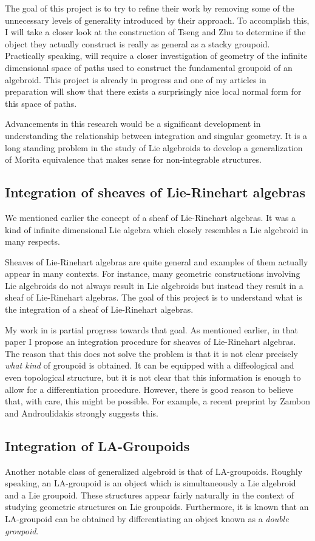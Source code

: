 \documentclass[11pt, letterpaper]{article}
\begin{document}
The goal of this project is to try to refine their work by removing some of the unnecessary levels of generality introduced by their approach. To accomplish this, I will take a closer look at the construction of Tseng and Zhu to determine if the object they actually construct is really as general as a stacky groupoid. Practically speaking, will require a closer investigation of geometry of the infinite dimensional space of paths used to construct the fundamental groupoid of an algebroid. This project is already in progress and one of my articles in preparation will show that there exists a surprisingly nice local normal form for this space of paths.

Advancements in this research would be a significant development in understanding the relationship between integration and singular geometry. It is a long standing problem in the study of Lie algebroids to develop a generalization of Morita equivalence that makes sense for non-integrable structures.
\subsection{Integration of sheaves of Lie-Rinehart algebras}\label{proj:lie.rinehart}
We mentioned earlier the concept of a sheaf of Lie-Rinehart algebras. It was a kind of infinite dimensional Lie algebra which closely resembles a Lie algebroid in many respects.

Sheaves of Lie-Rinehart algebras are quite general and examples of them actually appear in many contexts. For instance, many geometric constructions involving Lie algebroids do not always result in Lie algebroids but instead they result in a sheaf of Lie-Rinehart algebras. The goal of this project is to understand what is the integration of a sheaf of Lie-Rinehart algebras.

My work in \cite{fresh} is partial progress towards that goal. As mentioned earlier, in that paper I propose an integration procedure for sheaves of Lie-Rinehart algebras. The reason that this does not solve the problem is that it is not clear precisely \emph{what kind} of groupoid is obtained. It can be equipped with a diffeological and even topological structure, but it is not clear that this information is enough to allow for a differentiation procedure. However, there is good reason to believe that, with care, this might be possible. For example, a recent preprint by Zambon and Androulidakis\cite{androulidakis2020integration} strongly suggests this.
\subsection{Integration of LA-Groupoids}\label{proj:vb.algebroids}
Another notable class of generalized algebroid is that of LA-groupoids. Roughly speaking, an LA-groupoid is an object which is simultaneously a Lie algebroid and a Lie groupoid. These structures appear fairly naturally in the context of studying geometric structures on Lie groupoids. Furthermore, it is known that an LA-groupoid can be obtained by differentiating an object known as a \emph{double groupoid}.
\end{document}
